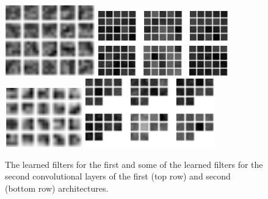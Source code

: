 \documentclass[5pt]{article}
\begin{document}
\begin{figure}[T]
  \centering{}
  \includegraphics[width=0.35\textwidth]{images/mnist_kernels11.png}
  \includegraphics[width=0.5\textwidth]{images/mnist_kernels12.png}
  \includegraphics[width=0.3\textwidth]{images/mnist_kernels21.png}
  \includegraphics[width=0.5\textwidth]{images/mnist_kernels22.png}
  \caption{The learned filters for the first and some of the learned filters
  for the second convolutional layers of the first (top row) and second
  (bottom row) architectures.}
\label{fig:mnist_kernels}
\end{figure}
\end{document}
